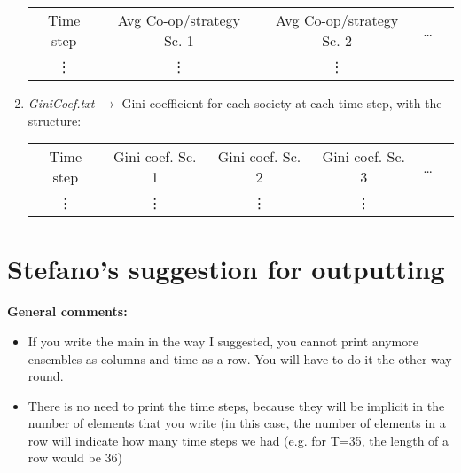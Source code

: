 \documentclass{article}
\begin{document}
\begin{enumerate}
\begin{center}
\begin{tabular}{c c c c c }
Time step & Avg Co-op/strategy Sc. 1 & Avg Co-op/strategy Sc. 2  & \dots \\
\vdots &  \vdots &  \vdots &
\end{tabular} 
\end{center}

\item \emph{GiniCoef.txt} $\rightarrow$ Gini coefficient for each society at each time step, with the structure:

\begin{center}
\begin{tabular}{c c c c c c}
Time step & Gini coef. Sc. 1 & Gini coef. Sc. 2 & Gini coef. Sc. 3  & \dots \\ 
\vdots & \vdots &  \vdots &  \vdots &
\end{tabular} 
\end{center}

\end{enumerate}

\section{Stefano's suggestion for outputting}
{\color{red}\textbf{General comments:}
\begin{itemize}
\item If you write the main in the way I suggested, you cannot print anymore ensembles as columns and time as a row. You will have to do it the other way round.
\item There is no need to print the time steps, because they will be implicit in the number of elements that you write (in this case, the number of elements in a row will indicate how many time steps we had (e.g. for T=35, the length of a row would be 36)
\end{itemize}
}
\end{document}

